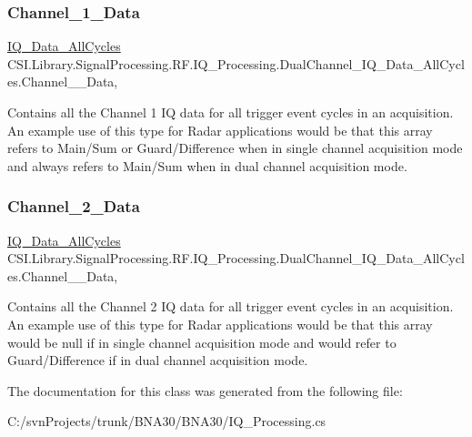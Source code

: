 \subsubsection{\texorpdfstring{Channel\_1\_Data}{Channel\_1\_Data}}
{\footnotesize\ttfamily \mbox{\hyperlink{class_c_s_i_1_1_library_1_1_signal_processing_1_1_r_f_1_1_i_q___processing_1_1_i_q___data___all_cycles}{I\+Q\+\_\+\+Data\+\_\+\+All\+Cycles}} C\+S\+I.\+Library.\+Signal\+Processing.\+R\+F.\+I\+Q\+\_\+\+Processing.\+Dual\+Channel\+\_\+\+I\+Q\+\_\+\+Data\+\_\+\+All\+Cycles.\+Channel\+\_\+\_\+\+Data\hspace{0.3cm}{\ttfamily [get]}, {\ttfamily [set]}}



Contains all the Channel 1 IQ data for all trigger event cycles in an acquisition. An example use of this type for Radar applications would be that this array refers to Main/\+Sum or Guard/\+Difference when in single channel acquisition mode and always refers to Main/\+Sum when in dual channel acquisition mode. 

\mbox{\label{class_c_s_i_1_1_library_1_1_signal_processing_1_1_r_f_1_1_i_q___processing_1_1_dual_channel___i_q___data___all_cycles_ae13c07e8518e3a80a7a522fdf15ed58a}} 
\subsubsection{\texorpdfstring{Channel\_2\_Data}{Channel\_2\_Data}}
{\footnotesize\ttfamily \mbox{\hyperlink{class_c_s_i_1_1_library_1_1_signal_processing_1_1_r_f_1_1_i_q___processing_1_1_i_q___data___all_cycles}{I\+Q\+\_\+\+Data\+\_\+\+All\+Cycles}} C\+S\+I.\+Library.\+Signal\+Processing.\+R\+F.\+I\+Q\+\_\+\+Processing.\+Dual\+Channel\+\_\+\+I\+Q\+\_\+\+Data\+\_\+\+All\+Cycles.\+Channel\+\_\+\_\+\+Data\hspace{0.3cm}{\ttfamily [get]}, {\ttfamily [set]}}



Contains all the Channel 2 IQ data for all trigger event cycles in an acquisition. An example use of this type for Radar applications would be that this array would be null if in single channel acquisition mode and would refer to Guard/\+Difference if in dual channel acquisition mode. 



The documentation for this class was generated from the following file\+:\begin{DoxyCompactItemize}
\item 
C\+:/svn\+Projects/trunk/\+B\+N\+A30/\+B\+N\+A30/I\+Q\+\_\+\+Processing.\+cs\end{DoxyCompactItemize}
